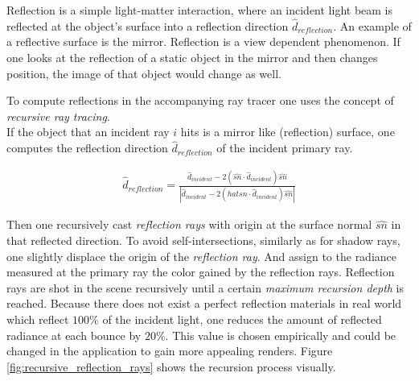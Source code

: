 \documentclass{article}
\begin{document}
Reflection is a simple light-matter interaction, where an incident light beam is reflected at the object's surface into a reflection direction $\hat{d}_{reflection}$. An example of a reflective surface is the mirror. Reflection is a view dependent phenomenon. If one looks at the reflection of a static object in the mirror and then changes position, the image of that object would change as well.

\vspace*{\baselineskip}

To compute reflections in the accompanying ray tracer one uses the concept of \textit{recursive ray tracing}. \cite{whitted} \\
If the object that an incident ray $i$ hits is a mirror like (reflection) surface, one computes the reflection direction $\hat{d}_{reflection}$ of the incident primary ray.

\begin{align}
\hat{d}_{reflection} = \frac{\hat{d}_{incident} - 2(\hat{sn} \cdot \hat{d}_{incident})\hat{sn}}{|\hat{d}_{incident} - 2(hat{sn} \cdot \hat{d}_{incident})\hat{sn}|}
\end{align}

Then one recursively cast \textit{reflection rays} with origin at the surface normal $\hat{sn}$ in that reflected direction. To avoid self-intersections, similarly as for shadow rays, one slightly displace the origin of the \textit{reflection ray}. And assign to the radiance measured at the primary ray the color gained by the reflection rays. Reflection rays are shot in the scene recursively until a certain \textit{maximum recursion depth} is reached. Because there does not exist a perfect reflection materials in real world which reflect $100\%$ of the incident light, one reduces the amount of reflected radiance at each bounce by $20\%$. This value is chosen empirically and could be changed in the application to gain more appealing renders. Figure \ref{fig:recursive_reflection_rays} shows the recursion process visually. 
\end{document}
